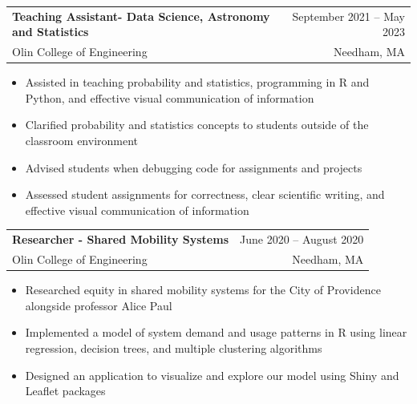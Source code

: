 \documentclass[a4paper,10pt]{article}
\makeatletter
\newcommand{\resumeItem}[1]{
  \item\small{
    {#1\vspace{-2pt}}
  }
}
\newcommand{\resumeSubheading}[4]{
  \vspace{-2pt}\item
    \begin{tabular*}{0.97\textwidth}[t]{l@{\extracolsep{\fill}}r}
      \textbf{#1} & #2 \\
      \small#3 & \small #4 \\
    \end{tabular*}\vspace{-7pt}
}
\newcommand{\resumeItemListStart}{\begin{itemize}}
\newcommand{\resumeItemListEnd}{\end{itemize}\vspace{-5pt}}
\makeatother
\begin{document}
    \resumeSubheading
      {Teaching Assistant- Data Science, Astronomy and Statistics}{September 2021 -- May 2023}
      {Olin College of Engineering}{Needham, MA}
      \resumeItemListStart
        \resumeItem{Assisted in teaching probability and statistics, programming in R and Python, and effective visual communication of information}
        \resumeItem{Clarified probability and statistics concepts to students outside of the classroom environment}
        \resumeItem{Advised students when debugging code for assignments and projects}
        \resumeItem{Assessed student assignments for correctness, clear scientific writing, and effective visual communication of information}
    \resumeItemListEnd


    \resumeSubheading
      {Researcher - Shared Mobility Systems}{June 2020 -- August 2020}
      {Olin College of Engineering}{Needham, MA}
      \resumeItemListStart
        \resumeItem{Researched equity in shared mobility systems for the City of Providence alongside professor Alice Paul}
        \resumeItem{Implemented a model of system demand and usage patterns in R using linear regression, decision trees, and multiple clustering algorithms}
        \resumeItem{Designed an application to visualize and explore our model using Shiny and Leaflet packages}
    \resumeItemListEnd
\end{document}
